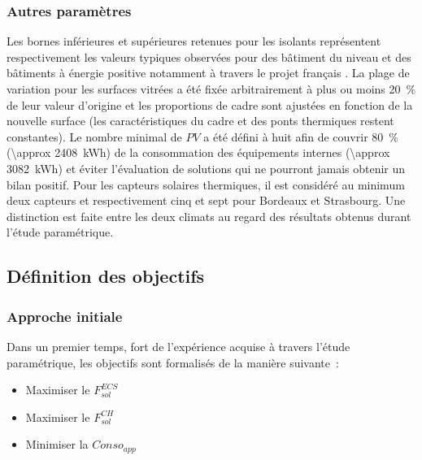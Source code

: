 \subsubsection{Autres paramètres} %
\label{ssub:autres_parametres}
Les bornes inférieures et supérieures retenues pour les isolants représentent respectivement les valeurs typiques observées
pour des bâtiment du niveau  et des bâtiments à énergie positive notamment à
travers le projet français .
La plage de variation pour les surfaces vitrées a été fixée arbitrairement à plus ou moins
\SI{20}{\percent} de leur valeur d’origine et les proportions de cadre sont ajustées
en fonction de la nouvelle surface (les caractéristiques du cadre et des ponts thermiques
restent constantes).
Le nombre minimal de $PV$ a été défini à huit afin de couvrir \SI{80}{\percent} (\SI{\approx 2408}{\kWh})
de la consommation des équipements internes (\SI{\approx 3082}{\kWh}) et éviter
l’évaluation de solutions qui ne pourront jamais obtenir un bilan positif.
Pour les capteurs solaires thermiques, il est considéré au minimum deux capteurs et respectivement
cinq et sept pour Bordeaux et Strasbourg. Une distinction est faite entre les deux climats
au regard des résultats obtenus durant l’étude paramétrique.



\subsection{Définition des objectifs} %
\label{sub:definition_des_objectifs}
\subsubsection{Approche initiale} %
\label{ssub:approche_initiale}
\noindent Dans un premier temps, fort de l’expérience acquise à travers l’étude paramétrique,
les objectifs sont formalisés de la manière suivante~:
\begin{itemize}
  \item Maximiser le $F_{sol}^{ECS}$
  \item Maximiser le $F_{sol}^{CH}$
  \item Minimiser la $Conso_{app}$
\end{itemize}


